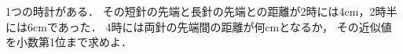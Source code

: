 \documentclass[../../main.tex]{subfiles}
\begin{document}
1つの時計がある．
その短針の先端と長針の先端との距離が2時には4cm，2時半には6cmであった．
4時には両針の先端間の距離が何cmとなるか，
その近似値を小数第1位まで求めよ．
\end{document}
